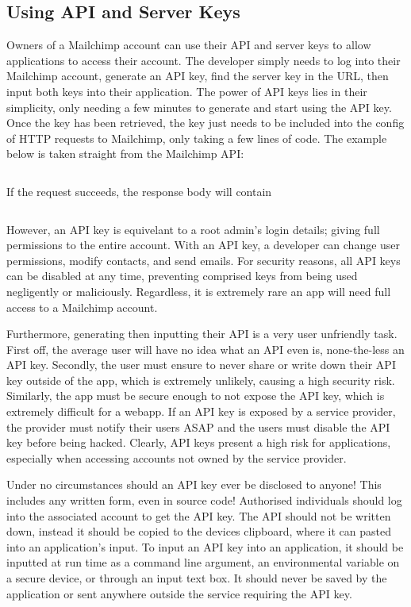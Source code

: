 \documentclass[11pt]{article}
\begin{document}
\subsection{Using API and Server Keys}

Owners of a Mailchimp account can use their API and server keys to allow applications to access their account. The developer simply needs to log into their Mailchimp account, generate an API key, find the server key in the URL, then input both keys into their application. The power of API keys lies in their simplicity, only needing a few minutes to generate and start using the API key. Once the key has been retrieved, the key just needs to be included into the config of HTTP requests to Mailchimp, only taking a few lines of code. The example below is taken straight from the Mailchimp API:

\inputminted[linenos=true]{python}{mailchimp_examples/mailchimp_ping.py}

\noindent
If the request succeeds, the response body will contain

\inputminted{json}{mailchimp_examples/ping_response.json}

However, an API key is equivelant to a root admin's login details; giving full permissions to the entire account. With an API key, a developer can change user permissions, modify contacts, and send emails. For security reasons, all API keys can be disabled at any time, preventing comprised keys from being used negligently or maliciously. Regardless, it is extremely rare an app will need full access to a Mailchimp account.

Furthermore, generating then inputting their API is a very user unfriendly task. First off, the average user will have no idea what an API even is, none-the-less an API key. Secondly, the user must ensure to never share or write down their API key outside of the app, which is extremely unlikely, causing a high security risk. Similarly, the app must be secure enough to not expose the API key, which is extremely difficult for a webapp. If an API key is exposed by a service provider, the provider must notify their users ASAP and the users must disable the API key before being hacked. Clearly, API keys present a high risk for applications, especially when accessing accounts not owned by the service provider.

\begin{warn}
Under no circumstances should an API key ever be disclosed to anyone! This includes any written form, even in source code! Authorised individuals should log into the associated account to get the API key. The API should not be written down, instead it should be copied to the devices clipboard, where it can pasted into an application's input. To input an API key into an application, it should be inputted at run time as a command line argument, an environmental variable on a secure device, or through an input text box. It should never be saved by the application or sent anywhere outside the service requiring the API key.
\end{warn}
\end{document}
